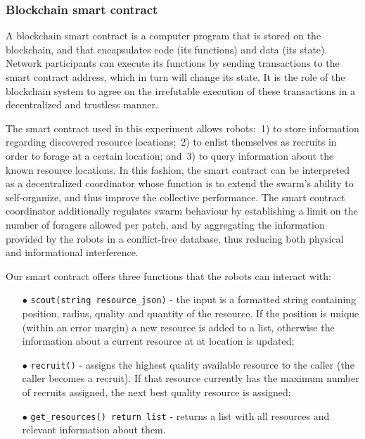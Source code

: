 \documentclass[runningheads]{llncs}
\begin{document}
\vspace{-5mm}
\subsubsection{Blockchain smart contract}
\label{sec:smart-contract}

A blockchain smart contract is a computer program that is stored on the blockchain, and that encapsulates code (its functions) and data (its state). Network participants can execute its functions by sending transactions to the smart contract address, which in turn will change its state. It is the role of the blockchain system to agree on the irrefutable execution of these transactions in a decentralized and trustless manner.

The smart contract used in this experiment allows robots:~1) to store information regarding discovered resource locations;~2) to enlist themselves as recruits in order to forage at a certain location; and~3) to query information about the known resource locations. In this fashion, the smart contract can be interpreted as a decentralized coordinator whose function is to extend the swarm's ability to self-organize, and thus improve the collective performance. The smart contract coordinator additionally regulates swarm behaviour by establishing a limit on the number of foragers allowed per patch, and by aggregating the information provided by the robots in a conflict-free database, thus reducing both physical and informational interference.

Our smart contract offers three functions that the robots can interact with:
\begin{itemize}
	\item[$\bullet$] \texttt{scout(string resource\_json)} - the input is a formatted string containing position, radius, quality and quantity of the resource. If the position is unique (within an error margin) a new resource is added to a list, otherwise the information about a current resource at at location is updated;
	\item[$\bullet$] \texttt{recruit()} - assigns the highest quality available resource to the caller (the caller becomes a recruit). If that resource currently has the maximum number of recruits assigned, the next best quality resource is assigned;
	\item[$\bullet$] \texttt{get\_resources() return list} - returns a list with all resources and relevant information about them.
\end{itemize}
\end{document}
